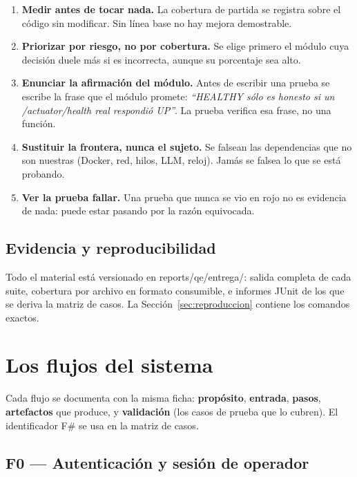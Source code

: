 \documentclass[11pt,a4paper]{article}
\newcommand{\code}[1]{{\ttfamily\small\def\_{\textunderscore\allowbreak}#1}}
\begin{document}
\begin{enumerate}[leftmargin=1.6em]
\item \textbf{Medir antes de tocar nada.} La cobertura de partida se registra sobre el código
      sin modificar. Sin línea base no hay mejora demostrable.
\item \textbf{Priorizar por riesgo, no por cobertura.} Se elige primero el módulo cuya
      decisión duele más si es incorrecta, aunque su porcentaje sea alto.
\item \textbf{Enunciar la afirmación del módulo.} Antes de escribir una prueba se escribe la
      frase que el módulo promete: \emph{``\code{HEALTHY} sólo es honesto si un
      \code{/actuator/health} real respondió \code{UP}''}. La prueba verifica esa frase, no
      una función.
\item \textbf{Sustituir la frontera, nunca el sujeto.} Se falsean las dependencias que no
      son nuestras (Docker, red, hilos, LLM, reloj). Jamás se falsea lo que se está probando.
\item \textbf{Ver la prueba fallar.} Una prueba que nunca se vio en rojo no es evidencia de
      nada: puede estar pasando por la razón equivocada.
\end{enumerate}

\subsection{Evidencia y reproducibilidad}

Todo el material está versionado en \code{reports/qe/entrega/}: salida completa de cada suite,
cobertura por archivo en formato consumible, e informes JUnit de los que se deriva la matriz de
casos. La Sección~\ref{sec:reproduccion} contiene los comandos exactos.

\section{Los flujos del sistema}
\label{sec:flujos}

Cada flujo se documenta con la misma ficha: \textbf{propósito}, \textbf{entrada},
\textbf{pasos}, \textbf{artefactos} que produce, y \textbf{validación} (los casos de prueba que
lo cubren). El identificador \code{F\#} se usa en la matriz de casos.

\subsection{F0 --- Autenticación y sesión de operador}
\end{document}

